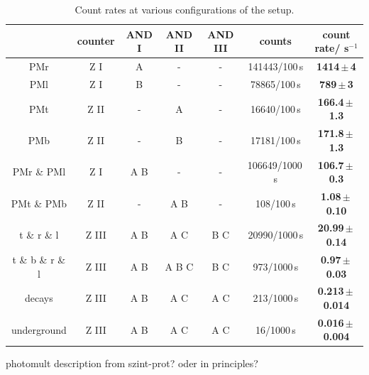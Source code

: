 \begin{table}[H]
\caption{Count rates at various configurations of the setup.}
\begin{center}
\begin{tabular}{|c||c|c|c|c|c|c|}
  \hline 
  					& counter	& AND I	& AND II	& AND III	& counts				& count rate\footnotemark/ s$^{-1}$			\\ \hline \hline
  PMr				& Z I		& A		& -			& -			& 141443/100\,s			& \textbf{1414\,$\pm$\,4}					\\ \hline
  PMl				& Z I		& B		& -			& -			& 78865/100\,s			& \textbf{789\,$\pm$\,3}					\\ \hline
  PMt				& Z II		& -		& A			& -			& 16640/100\,s			& \textbf{166.4\,$\pm$\,1.3}				\\ \hline
  PMb				& Z II		& -		& B			& -			& 17181/100\,s			& \textbf{171.8\,$\pm$\,1.3}				\\ \hline
  PMr \& PMl		& Z I		& A B	& -			& -			& 106649/1000\,s		& \textbf{106.7\,$\pm$\,0.3}				\\ \hline
  PMt \& PMb		& Z II		& -		& A B		& -			& 108/100\,s			& \textbf{1.08\,$\pm$\,0.10}				\\ \hline
  t \& r \& l		& Z III		& A B	& A	C		& B C		& 20990/1000\,s			& \textbf{20.99\,$\pm$\,0.14}				\\ \hline
  t \& b \& r \& l  & Z III		& A B	& A	B C		& B C		& 973/1000\,s			& \textbf{0.97\,$\pm$\,0.03}				\\ \hline
  decays			& Z III		& A B	& A	C		& A C		& 213/1000\,s			& \textbf{0.213\,$\pm$\,0.014}				\\ \hline
  underground\footnotemark		& Z III		& A B	& A	C		& A C		& 16/1000\,s			& \textbf{0.016\,$\pm$\,0.004}				\\ \hline
\end{tabular}
\end{center}
\label{tab:countrates}
\end{table}

\addtocounter{footnote}{-1}
\addtocounter{footnote}{1}

photomult description from szint-prot? oder in principles?
